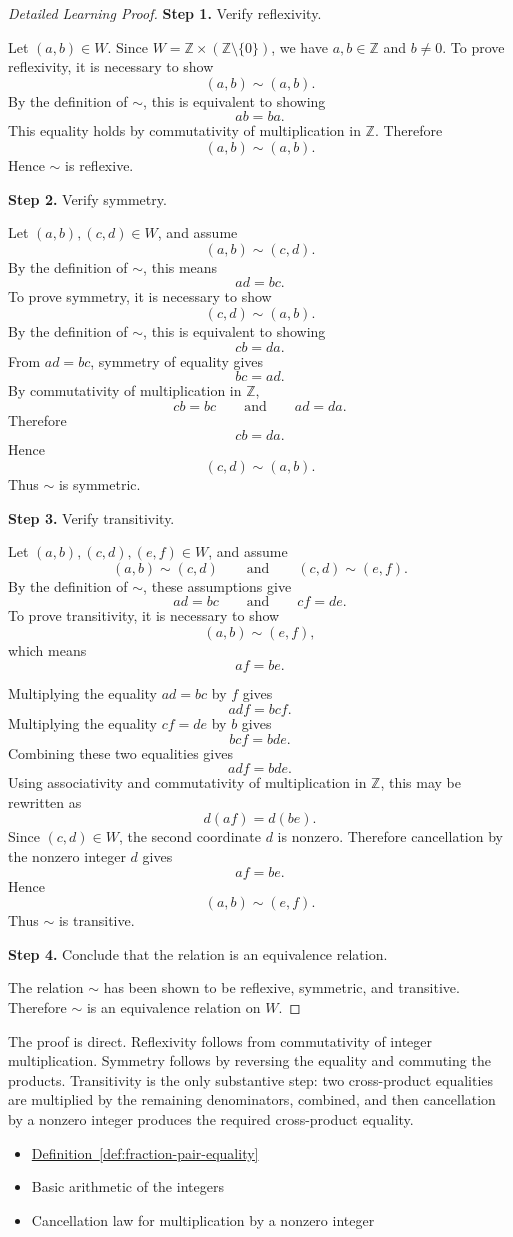 \begin{proof}[Detailed Learning Proof]
\LRAProofBodyStart

\textbf{Step 1.} Verify reflexivity.

Let $(a,b)\in W$. Since $W=\mathbb{Z}\times(\mathbb{Z}\setminus\{0\})$,
we have $a,b\in\mathbb{Z}$ and $b\neq 0$. To prove reflexivity, it is
necessary to show
\[
(a,b)\sim(a,b).
\]
By the definition of $\sim$, this is equivalent to showing
\[
ab=ba.
\]
This equality holds by commutativity of multiplication in $\mathbb{Z}$.
Therefore
\[
(a,b)\sim(a,b).
\]
Hence $\sim$ is reflexive.

\textbf{Step 2.} Verify symmetry.

Let $(a,b),(c,d)\in W$, and assume
\[
(a,b)\sim(c,d).
\]
By the definition of $\sim$, this means
\[
ad=bc.
\]
To prove symmetry, it is necessary to show
\[
(c,d)\sim(a,b).
\]
By the definition of $\sim$, this is equivalent to showing
\[
cb=da.
\]
From $ad=bc$, symmetry of equality gives
\[
bc=ad.
\]
By commutativity of multiplication in $\mathbb{Z}$,
\[
cb=bc
\qquad\text{and}\qquad
ad=da.
\]
Therefore
\[
cb=da.
\]
Hence
\[
(c,d)\sim(a,b).
\]
Thus $\sim$ is symmetric.

\textbf{Step 3.} Verify transitivity.

Let $(a,b),(c,d),(e,f)\in W$, and assume
\[
(a,b)\sim(c,d)
\qquad\text{and}\qquad
(c,d)\sim(e,f).
\]
By the definition of $\sim$, these assumptions give
\[
ad=bc
\qquad\text{and}\qquad
cf=de.
\]
To prove transitivity, it is necessary to show
\[
(a,b)\sim(e,f),
\]
which means
\[
af=be.
\]

Multiplying the equality $ad=bc$ by $f$ gives
\[
adf=bcf.
\]
Multiplying the equality $cf=de$ by $b$ gives
\[
bcf=bde.
\]
Combining these two equalities gives
\[
adf=bde.
\]
Using associativity and commutativity of multiplication in $\mathbb{Z}$,
this may be rewritten as
\[
d(af)=d(be).
\]
Since $(c,d)\in W$, the second coordinate $d$ is nonzero. Therefore
cancellation by the nonzero integer $d$ gives
\[
af=be.
\]
Hence
\[
(a,b)\sim(e,f).
\]
Thus $\sim$ is transitive.

\textbf{Step 4.} Conclude that the relation is an equivalence relation.

The relation $\sim$ has been shown to be reflexive, symmetric, and
transitive. Therefore $\sim$ is an equivalence relation on $W$.
\end{proof}

\begin{remark*}
The proof is direct. Reflexivity follows from commutativity of integer
multiplication. Symmetry follows by reversing the equality and commuting
the products. Transitivity is the only substantive step: two cross-product
equalities are multiplied by the remaining denominators, combined, and
then cancellation by a nonzero integer produces the required cross-product
equality.
\end{remark*}

\begin{dependencies}
\begin{itemize}
  \item \hyperref[def:fraction-pair-equality]{Definition~\ref*{def:fraction-pair-equality}}
  \item Basic arithmetic of the integers
  \item Cancellation law for multiplication by a nonzero integer
\end{itemize}
\end{dependencies}

\clearpage
